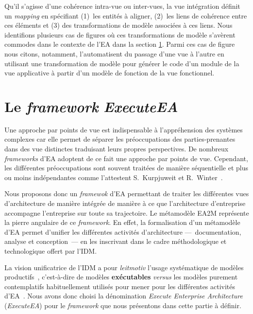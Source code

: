 

Qu'il s’agisse d'une cohérence intra-vue ou inter-vues, la vue intégration définit un \textit{mapping} en spécifiant
(1)~les entités à aligner, (2)~les liens de cohérence entre ces éléments et (3) des transformations de modèle
associées à ces liens. Nous identifions plusieurs cas de figures où ces transformations de modèle s'avèrent commodes
dans le contexte de l'EA dans la section \ref{sec:executeea}. Parmi ces cas de figure nous citons, notamment,
l'automatisent du passage d'une vue à l'autre en utilisant une transformation de modèle pour générer le code
d'un module de la vue applicative à partir d'un modèle de fonction de la vue fonctionnel.

\section[Le framework ExecuteEA]{Le \emph{framework} \emph{ExecuteEA}}
\label{sec:executeea}
    

    Une approche par points de vue est indispensable à l’appréhension des systèmes complexes car elle permet de séparer
    les préoccupations des parties-prenantes dans des vue distinctes traduisant leurs propres perspectives.
    De nombreux \emph{frameworks} d'EA adoptent de ce fait une approche par points de vue. Cependant, les différentes préoccupations
    sont souvent traitées de manière séquentielle et plus ou moins indépendantes comme l'attestent
    S.~Kurpjuweit et R.~Winter~\cite{kurpjuweit2007viewpoint}.

    Nous proposons donc un \emph{framewok} d'EA permettant de traiter
    les différentes vues d'architecture de manière intégrée de manière à ce que l'architecture d'entreprise accompagne l'entreprise
    sur toute sa trajectoire.  Le métamodèle EA2M représente la pierre angulaire de ce \emph{framework}.
    En effet, la formalisation d'un métamodèle d'EA permet d'unifier les différentes activités d'architecture —~documentation, analyse et conception~— en les inscrivant dans le cadre méthodologique et technologique offert par l'IDM.

    La vision unificatrice de l'IDM a pour \emph{leitmotiv} l'usage systématique de modèles productifs~\cite{2005unification}, c'est-à-dire
    de modèles \textbf{exécutables} \emph{versus} les modèles purement contemplatifs habituellement utilisés pour mener 
    pour les différentes activités d'EA~\cite{kulkarni2013modelling}. Nous avons donc choisi la dénomination \emph{Execute Enterprise Architecture} (\emph{ExecuteEA}) pour le \emph{framework} que nous présentons dans cette partie à définir.


